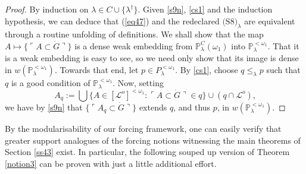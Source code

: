 \documentclass[12pt, twoside]{memoir}
\numberwithin{equation}{section}
\theoremstyle{definition}
\theoremstyle{remark}
\theoremstyle{definition}
\theoremstyle{definition}
\theoremstyle{definition}
\theoremstyle{remark}
\begin{document}
\begin{proof}
By induction on $\lambda \in C \cup \{\lambda^{\dagger}\}$. Given \ref{s9n}, \ref{cs1} and the induction hypothesis, we can deduce that (\ref{eq47}) and the redeclared $\hyperref[s8n]{\text{(S8)}_{\lambda}}$ are equivalent through a routine unfolding of definitions. We shall show that the map $A \mapsto \{\ulcorner A \subset \dot{G} \urcorner\}$ is a dense weak embedding from $\mathbb{P}^C_{\lambda}(\omega_1)$ into $\mathbb{P}^{< \omega_1}_{\lambda}$. That it is a weak embedding is easy to see, so we need only show that its image is dense in $w(\mathbb{P}^{< \omega_1}_{\lambda})$. Towards that end, let $p \in P^{< \omega_1}_{\lambda}$. By \ref{cs1}, choose $q \leq_{\lambda} p$ such that $q$ is a good condition of $\mathbb{P}^{< \omega_1}_{\lambda}$. Now, setting 
\begin{equation*}
    A_q := \bigcup \{A \in [\mathcal{L}^o]^{< \omega_1} : \ulcorner A \subset \dot{G} \urcorner \in q\} \cup (q \cap \mathcal{L}^o) \text{,}
\end{equation*}
we have by \ref{s9n} that $\{\ulcorner A_q \subset \dot{G} \urcorner\}$ extends $q$, and thus $p$, in $w(\mathbb{P}^{< \omega_1}_{\lambda})$.
\end{proof}

By the modularisability of our forcing framework, one can easily verify that greater support analogues of the forcing notions witnessing the main theorems of Section \ref{ss43} exist. In particular, the following souped up version of Theorem \ref{notion3} can be proven with just a little additional effort.
\end{document}
